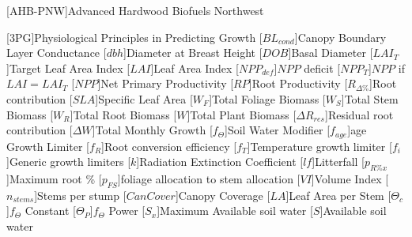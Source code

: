 \usepackage[printonlyused]{acronym}
[AHB-PNW]{Advanced Hardwood Biofuels Northwest}

[\textsc{3PG}]{Physiological Principles in Predicting Growth}
[\ensuremath{BL_{cond}}]{Canopy Boundary Layer Conductance}
[\ensuremath{dbh}]{Diameter at Breast Height}
[\ensuremath{DOB}]{Basal Diameter}
[\ensuremath{LAI_{T}}]{Target Leaf Area Index}
[\ensuremath{LAI}]{Leaf Area Index}
[\ensuremath{NPP_{def}}]{$NPP$ deficit}
[\ensuremath{NPP_{T}}]{$NPP$ if $LAI = LAI_{T}$}
[\ensuremath{NPP}]{Net Primary Productivity}
[\ensuremath{RP}]{Root Productivity}
[\ensuremath{R_{\Delta\%}}]{Root contribution}
[\ensuremath{SLA}]{Specific Leaf Area}
[\ensuremath{W_F}]{Total Foliage Biomass}
[\ensuremath{W_S}]{Total Stem Biomass}
[\ensuremath{W_R}]{Total Root Biomass}
[\ensuremath{W}]{Total Plant Biomass}
[\ensuremath{\Delta R_{res}}]{Residual root contribution}
[\ensuremath{\Delta W}]{Total Monthly Growth}
[\ensuremath{f_\Theta}]{Soil Water Modifier}
[\ensuremath{f_{age}}]{age Growth Limiter}
[\ensuremath{f_R}]{Root conversion efficiency}
[\ensuremath{f_T}]{Temperature growth limiter}
[\ensuremath{f_i}]{Generic growth limiters}
[\ensuremath{k}]{Radiation Extinction Coefficient}
[\ensuremath{lf}]{Litterfall}
[\ensuremath{p_{R\%x}}]{Maximum root \%}
[\ensuremath{p_{FS}}]{foliage allocation to stem allocation}
[\ensuremath{VI}]{Volume Index}
[\ensuremath{n_{stems}}]{Stems per stump}
[\ensuremath{CanCover}]{Canopy Coverage}
[\ensuremath{LA}]{Leaf Area per Stem}
[\ensuremath{\Theta_{c}}]{$f_\Theta$ Constant}
[\ensuremath{\Theta_{P}}]{$f_\Theta$ Power}
[\ensuremath{S_x}]{Maximum Available soil water}
[\ensuremath{S}]{Available soil water}